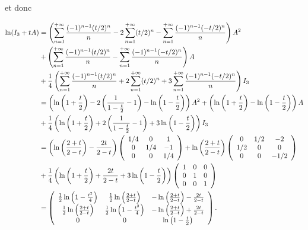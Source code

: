 {{et donc

\begin{align*}\ensuremath
\ln(I_3+tA)&=\left(\sum_{n=1}^{+\infty} \frac{(-1)^{n-1}(t/2)^n}{n}-2\sum_{n=1}^{+\infty}(t/2)^n-\sum_{n=1}^{+\infty} \frac{(-1)^{n-1}(-t/2)^n}{n}\right)A^2\\
 &+\left(\sum_{n=1}^{+\infty} \frac{(-1)^{n-1}(t/2)^n}{n}-\sum_{n=1}^{+\infty} \frac{(-1)^{n-1}(-t/2)^n}{n}\right)A\\
  &+ \frac{1}{4}\left(\sum_{n=1}^{+\infty} \frac{(-1)^{n-1}(t/2)^n}{n}+2\sum_{n=1}^{+\infty}(t/2)^n+3\sum_{n=1}^{+\infty} \frac{(-1)^{n-1}(-t/2)^n}{n}\right)I_3\\
  &=\left(\ln\left(1+ \frac{t}{2}\right)-2\left( \frac{1}{1- \frac{t}{2}}-1\right)-\ln\left(1- \frac{t}{2}\right)\right)A^2+\left(\ln\left(1+ \frac{t}{2}\right)-\ln\left(1- \frac{t}{2}\right)\right)A\\
  &+ \frac{1}{4}\left(\ln\left(1+ \frac{t}{2}\right)+2\left( \frac{1}{1- \frac{t}{2}}-1\right)+3\ln\left(1- \frac{t}{2}\right)\right)I_3\\
  &=\left(\ln\left( \frac{2+t}{2-t}\right)- \frac{2t}{2-t}\right)\left(
\begin{array}{ccc}
1/4&0&1\\
0&1/4&-1\\
0&0&1/4
\end{array}
\right)+\ln\left( \frac{2+t}{2-t}\right)\left(
\begin{array}{ccc}
0&1/2&-2\\
1/2&0&0\\
0&0&-1/2
\end{array}
\right)\\
  &+ \frac{1}{4}\left(\ln\left(1+ \frac{t}{2}\right)+ \frac{2t}{2-t}+3\ln\left(1- \frac{t}{2}\right)\right)\left(
\begin{array}{ccc}
1&0&0\\
0&1&0\\
0&0&1
\end{array}
\right)\\
 &=\left(
 \begin{array}{ccc}
 \frac{1}{2}\ln\left(1- \frac{t^2}{4}\right)& \frac{1}{2}\ln\left( \frac{2+t}{2-t}\right)&-\ln\left( \frac{2+t}{2-t}\right)- \frac{2t}{2-t}\\
 \frac{1}{2}\ln\left( \frac{2+t}{2-t}\right)& \frac{1}{2}\ln\left(1- \frac{t^2}{4}\right)&-\ln\left( \frac{2+t}{2-t}\right)+ \frac{2t}{2-t}\\
 0&0&\ln\left(1- \frac{t}{2}\right)
 \end{array}
 \right).
\end{align*}

}}
